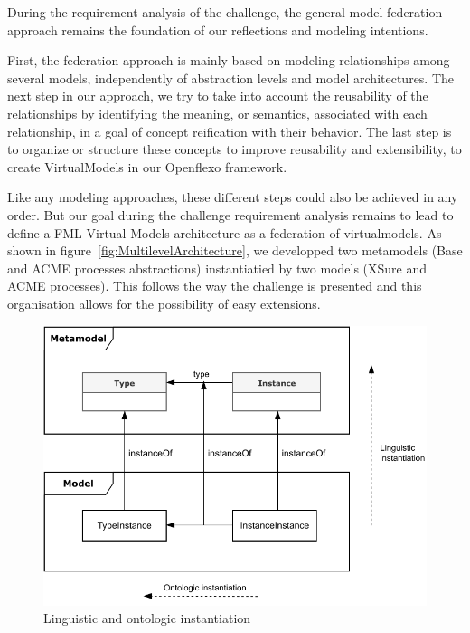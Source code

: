 
During the requirement analysis of the challenge, the general model federation approach remains the foundation of our reflections and modeling intentions. 

First, the federation approach is mainly based on modeling relationships among several models, independently of abstraction levels and model architectures.
The next step in our approach, we try to take into account the reusability of the relationships by identifying the meaning, or semantics, associated with each relationship, in a goal of concept reification with their behavior. The last step is to organize or structure these concepts to improve reusability and extensibility, to create VirtualModels in our Openflexo framework.     

Like any modeling approaches, these different steps could also be achieved in any order. But our goal during the challenge requirement analysis remains to lead to define a FML Virtual Models architecture as a federation of virtualmodels. As shown in figure~\ref{fig:MultilevelArchitecture}, we developped two metamodels (Base and ACME processes abstractions) instantiatied by two models (XSure and ACME processes). This follows the way the challenge is presented and this organisation allows for the possibility of easy extensions.


\begin{figure}
    \centering
    \includegraphics[width=1.0 \columnwidth]{Figures/Instantiation.pdf}
    \caption{Linguistic and ontologic instantiation}
    \label{fig:LinguisticAndOntologicInstantiation}
\end{figure}



